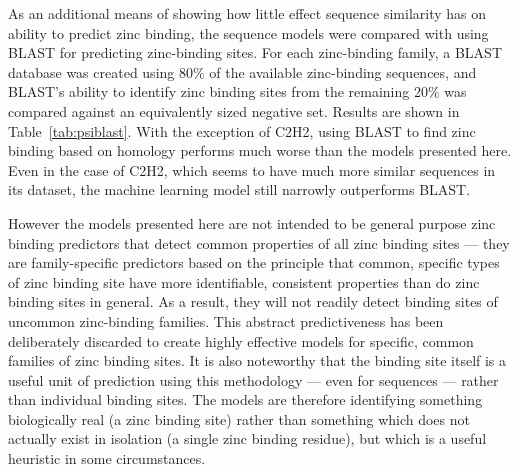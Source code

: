 As an additional means of showing how little effect sequence similarity has on ability to predict zinc binding, the sequence models were compared with using BLAST for predicting zinc-binding sites. For each zinc-binding family, a BLAST database was created using 80\% of the available zinc-binding sequences, and BLAST's ability
to identify zinc binding sites from the remaining 20\% was compared against an equivalently sized negative set. Results are shown in Table~\ref{tab:psiblast}. With the exception of C2H2, using BLAST to find zinc binding based on homology performs much worse than the models presented here. Even in the case of C2H2, which seems to have much more similar sequences in its dataset, the machine learning model still narrowly outperforms BLAST.

However the models presented here are not intended to be general purpose zinc binding predictors that detect common properties of all zinc binding sites --- they are family-specific predictors based on the principle that common, specific types of zinc binding site have more identifiable, consistent properties than do zinc binding sites in general. As a result, they will not readily detect binding sites of uncommon zinc-binding families. This abstract predictiveness has been deliberately discarded to create highly effective models for specific, common families of zinc binding sites. It is also noteworthy that the binding site itself is a useful unit of prediction using this
methodology --- even for sequences --- rather than individual binding sites. The models are therefore identifying something biologically real (a zinc binding site) rather than something which does not actually exist in isolation (a single zinc binding residue), but which is a useful heuristic in some circumstances.

